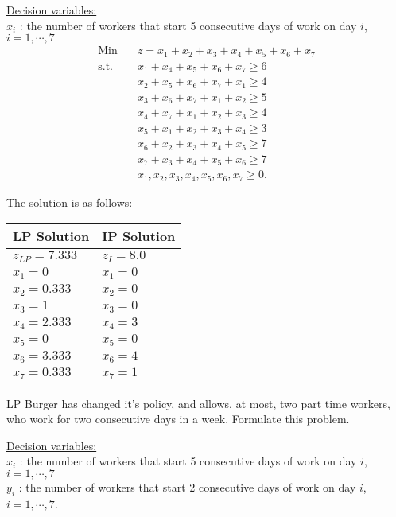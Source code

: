 \underline{Decision variables:} \\
$x_i$ : the number of workers that start 5 consecutive days of work on day $i$, $ i = 1,\cdots,7$ \\

\begin{align*}
\mbox{Min~~ } & z = x_1 + x_2 + x_3 + x_4 + x_5 + x_6 + x_7  \\
\mbox{s.t.~~} & x_1 + x_4 + x_5 + x_6 + x_7 \ge 6 \\
& x_2 + x_5 + x_6 + x_7 + x_1 \ge 4 \\
& x_3 + x_6 + x_7 + x_1 + x_2 \ge 5 \\
& x_4 + x_7 + x_1 + x_2 + x_3 \ge 4 \\
& x_5 + x_1 + x_2 + x_3 + x_4 \ge 3 \\
& x_6 + x_2 + x_3 + x_4 + x_5 \ge 7 \\
& x_7 + x_3 + x_4 + x_5 + x_6 \ge 7 \\
& x_1, x_2, x_3, x_4, x_5, x_6, x_7 \ge 0.
\end{align*}

The solution is as follows:
\begin{table}[h!] \begin{center} \begin{tabular} {|l|l|}
\hline   LP Solution        & IP Solution \\
\hline  $z_{LP} = 7.333$    & $z_I = 8.0$ \\
\hline  $x_1 = 0$           & $x_1 = 0$ \\
\hline  $x_2 = 0.333$       & $x_2 = 0 $ \\
\hline  $x_3 = 1$           & $x_3 = 0$ \\
\hline  $x_4 = 2.333$       & $x_4 = 3$ \\
\hline  $x_5 = 0$           & $x_5 = 0 $ \\
\hline  $x_6 = 3.333$       & $x_6 = 4 $ \\
\hline  $x_7 = 0.333$       & $x_7 = 1 $ \\
\hline
\end{tabular} \end{center} \end{table}

\medskip  LP Burger has changed it's policy, and allows, at most, two part time workers, who work for two consecutive days in a week.  Formulate this problem.

\underline{Decision variables:} \\
$x_i$ : the number of workers that start 5 consecutive days of work on day $i$, $ i = 1,\cdots,7$ \\
$y_i$ : the number of workers that start 2 consecutive days of work on day $i$, $ i = 1,\cdots,7$.

